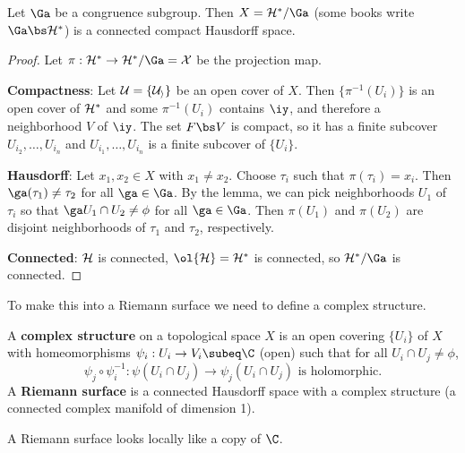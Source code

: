 \begin{thm}
Let $\Ga$ be a congruence subgroup. Then $X=\cal H^*/\Ga$ (some books write $\Ga\bs \cal H^*$) is a connected compact Hausdorff space.
\end{thm}
\begin{proof}
Let $\pi:\cal H^*\to \cal H^*/\Ga=X$ be the projection map.

\textbf{Compactness}: Let $\cal U=\{U_i\}$ be an open cover of $X$. Then $\{\pi^{-1}(U_i)\}$ is an open cover of $\cal H^*$ and some $\pi^{-1}(U_i)$ contains $\iy$, and therefore a neighborhood $V$ of $\iy$. The set $F\bs V$ is compact, so it has a finite subcover $U_{i_2},\ldots, U_{i_n}$ and $U_{i_1},\ldots, U_{i_n}$ is a finite subcover of $\{U_i\}$.

\textbf{Hausdorff}: Let $x_1,x_2\in X$ with $x_1\ne x_2$. Choose $\tau_i$ such that $\pi(\tau_i)=x_i$. Then $\ga(\tau_1)\ne\tau_2$ for all $\ga\in \Ga$. By the lemma, we can pick neighborhoods $U_1$ of $\tau_i$ so that $\ga U_1\cap U_2\ne \phi$ for all $\ga\in \Ga$. Then $\pi(U_1)$ and $\pi(U_2)$ are disjoint neighborhoods of $\tau_1$ and $\tau_2$, respectively.

\textbf{Connected}: $\cal H$ is connected, $\ol{\cal H}=\cal H^*$ is connected, so $\cal H^*/\Ga$ is connected.
\end{proof}
To make this into a Riemann surface we need to define a complex structure.
\begin{df}
A \textbf{complex structure} on a topological space $X$ is an open covering $\{U_i\}$ of $X$ with homeomorphisms $\psi_i:U_i\to V_i\subeq \C$ (open) such that for all $U_i\cap U_j\ne \phi$, 
\[
\psi_j\circ \psi_i^{-1}:\psi(U_i\cap U_j)\to \psi_j(U_i\cap U_j)\text{ is holomorphic.}
\]
A \textbf{Riemann surface} is a connected Hausdorff space with a complex structure (a connected complex manifold of dimension 1).
\end{df}
A Riemann surface looks locally like a copy of $\C$.

